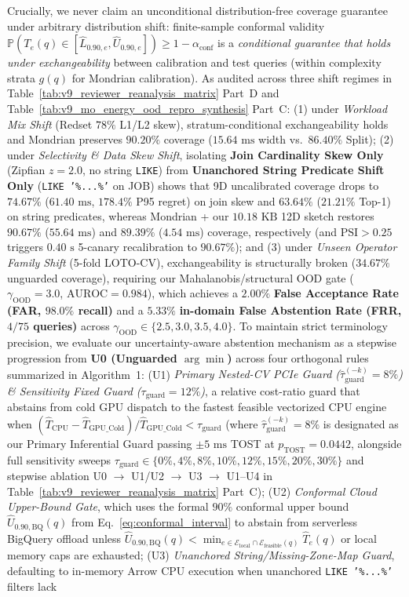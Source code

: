 \documentclass[10pt,a4paper]{article}
\begin{document}
Crucially, we never claim an unconditional distribution-free coverage guarantee under arbitrary distribution shift: finite-sample conformal validity $\mathbb{P}(T_e(q) \in [\hat{L}_{0.90,e}, \hat{U}_{0.90,e}]) \ge 1 - \alpha_{\text{conf}}$ is a \emph{conditional guarantee that holds under exchangeability} between calibration and test queries (within complexity strata $g(q)$ for Mondrian calibration). As audited across three shift regimes in Table~\ref{tab:v9_reviewer_reanalysis_matrix} Part~D and Table~\ref{tab:v9_mo_energy_ood_repro_synthesis} Part~C: (1) under \emph{Workload Mix Shift} (Redset $78\%$ L1/L2 skew), stratum-conditional exchangeability holds and Mondrian preserves $90.20\%$ coverage ($15.64\text{ ms}$ width vs.\ $86.40\%$ Split); (2) under \emph{Selectivity \& Data Skew Shift}, isolating \textbf{Join Cardinality Skew Only} (Zipfian $z=2.0$, no string \texttt{LIKE}) from \textbf{Unanchored String Predicate Shift Only} (\texttt{LIKE '\%...\%'} on JOB) shows that 9D uncalibrated coverage drops to $74.67\%$ ($61.40\text{ ms}$, $178.4\%$ P95 regret) on join skew and $63.64\%$ ($21.21\%$ Top-1) on string predicates, whereas Mondrian + our $10.18\text{ KB}$ 12D sketch restores $90.67\%$ ($55.64\text{ ms}$) and $89.39\%$ ($4.54\text{ ms}$) coverage, respectively (and $\text{PSI}>0.25$ triggers $0.40\text{ s}$ 5-canary recalibration to $90.67\%$); and (3) under \emph{Unseen Operator Family Shift} (5-fold LOTO-CV), exchangeability is structurally broken ($34.67\%$ unguarded coverage), requiring our Mahalanobis/structural OOD gate ($\gamma_{\text{OOD}}=3.0$, $\text{AUROC}=0.984$), which achieves a $\mathbf{2.00\%}$ \textbf{False Acceptance Rate (FAR, $98.0\%$ recall)} and a $\mathbf{5.33\%}$ \textbf{in-domain False Abstention Rate (FRR, $4/75$ queries)} across $\gamma_{\text{OOD}}\in\{2.5,3.0,3.5,4.0\}$. To maintain strict terminology precision, we evaluate our uncertainty-aware abstention mechanism as a stepwise progression from \textbf{U0 (Unguarded $\arg\min$)} across four orthogonal rules summarized in Algorithm~1: (U1) \emph{Primary Nested-CV PCIe Guard ($\hat{\tau}_{\text{guard}}^{(-k)}=8\%$) \& Sensitivity Fixed Guard ($\tau_{\text{guard}}=12\%$)}, a relative cost-ratio guard that abstains from cold GPU dispatch to the fastest feasible vectorized CPU engine when $(\hat{T}_{\text{CPU}} - \hat{T}_{\text{GPU\_Cold}})/\hat{T}_{\text{GPU\_Cold}} < \tau_{\text{guard}}$ (where $\hat{\tau}_{\text{guard}}^{(-k)}=8\%$ is designated as our Primary Inferential Guard passing $\pm 5\text{ ms}$ TOST at $p_{\text{TOST}}=0.0442$, alongside full sensitivity sweeps $\tau_{\text{guard}}\in\{0\%,4\%,8\%,10\%,12\%,15\%,20\%,30\%\}$ and stepwise ablation U0 $\rightarrow$ U1/U2 $\rightarrow$ U3 $\rightarrow$ U1--U4 in Table~\ref{tab:v9_reviewer_reanalysis_matrix} Part~C); (U2) \emph{Conformal Cloud Upper-Bound Gate}, which uses the formal $90\%$ conformal upper bound $\hat{U}_{0.90,\text{BQ}}(q)$ from Eq.~\eqref{eq:conformal_interval} to abstain from serverless BigQuery offload unless $\hat{U}_{0.90,\text{BQ}}(q) < \min_{e \in \mathcal{E}_{\text{local}}\cap\mathcal{E}_{\text{feasible}}(q)} \hat{T}_e(q)$ or local memory caps are exhausted; (U3) \emph{Unanchored String/Missing-Zone-Map Guard}, defaulting to in-memory Arrow CPU execution when unanchored \texttt{LIKE '\%...\%'} filters lack 
\end{document}
